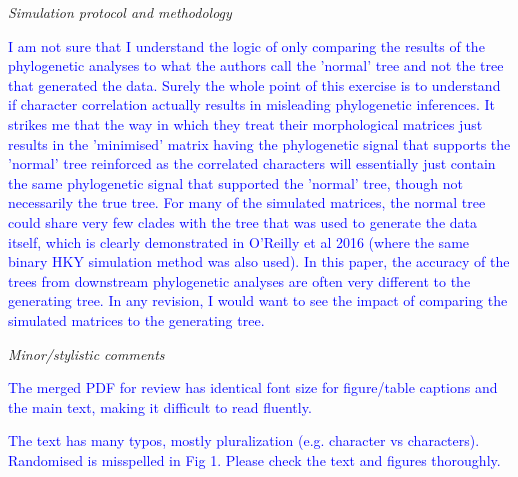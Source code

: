 \documentclass[12pt,letterpaper]{article}
\renewcommand{\subsection}[1]{%
\bigskip
\begin{center}
\begin{large}
\normalfont\itshape #1
\end{large}
\end{center}}
\begin{document}
\subsection{Simulation protocol and methodology}

\textcolor{blue}{I am not sure that I understand the logic of only comparing the results of the phylogenetic analyses to what the authors call the 'normal' tree and not the tree that generated the data. Surely the whole point of this exercise is to understand if character correlation actually results in misleading phylogenetic inferences. It strikes me that the way in which they treat their morphological matrices just results in the 'minimised' matrix having the phylogenetic signal that supports the 'normal' tree reinforced as the correlated characters will essentially just contain the same phylogenetic signal that supported the 'normal' tree, though not necessarily the true tree.  For many of the simulated matrices, the normal tree could share very few clades with the tree that was used to generate the data itself, which is clearly demonstrated in O'Reilly et al 2016 (where the same binary HKY simulation method was also used). In this paper, the accuracy of the trees from downstream phylogenetic analyses are often very different to the generating tree. In any revision, I would want to see the impact of comparing the simulated matrices to the generating tree. }

\subsection{Minor/stylistic comments}

\textcolor{blue}{The merged PDF for review has identical font size for figure/table captions and the main text, making it difficult to read fluently.}

\textcolor{blue}{The text has many typos, mostly pluralization (e.g. character vs characters). Randomised is misspelled in Fig 1. Please check the text and figures thoroughly.}




\end{document}

